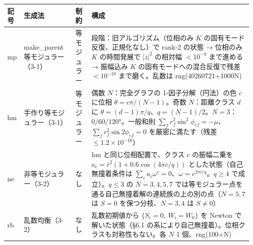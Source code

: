 \documentclass[
  10pt,
  a4paper,
]{ltjsarticle}
\newcounter{none} %
\begin{document}
{\def\LTcaptype{none} %
\begin{longtable}[]{@{}
  >{\raggedright\arraybackslash}p{}
  >{\raggedright\arraybackslash}p{}
  >{\raggedright\arraybackslash}p{}
  >{\raggedright\arraybackslash}p{}@{}}
\toprule\noalign{}
\begin{minipage}[b]{\linewidth}\raggedright
記号
\end{minipage} & \begin{minipage}[b]{\linewidth}\raggedright
生成法
\end{minipage} & \begin{minipage}[b]{\linewidth}\raggedright
制約
\end{minipage} & \begin{minipage}[b]{\linewidth}\raggedright
構成
\end{minipage} \\
\midrule\noalign{}
\endhead
\bottomrule\noalign{}
\endlastfoot
mp & make\_parent 等モジュラー（3-1） & 等モジュラー & 3
段階：旧アルゴリズム（位相のみ \(K\) の固有モード反復、正規化なし）で
rank-2 の状態 → 位相のみ \(K\) の時間発展で \(|z|^2\) の相対幅
\(<10^{-9}\) まで進める → 振幅込み \(K\) の固有モードへの混合反復で残差
\(<10^{-10}\) まで磨く。乱数は rng(40260721+1000N) \\
hm & 手作り等モジュラー（3-1） & 等モジュラー & 偶数 \(N\)：完全グラフの
1-因子分解（円法）の色 \(c\) に位相 \(\theta=c\pi/(N-1)\)。奇数
\(N\)：距離クラス \(d\) に
\(\theta=(d-1)\pi/q\)、\(q=(N-1)/2\)。\(N=3\)：\(0/60/120°\)。一般和則
\(\sum_f r_f^2\sin^2\phi_{ef}=-\mu\)、\(\sum_f r_f^2\sin2\phi_{ef}=0\)
を厳密に満たす（残差 \(\le1.2\times10^{-16}\)） \\
ne & 非等モジュラー（3-2） & なし & hm と同じ位相配置で、クラス \(c\)
の振幅二乗を \(a_c=\bar r^2(1+0.6\cos(4\pi c/q))\)
とした状態（自己無撞着条件は
\(\sum_ca_c\omega^c=0\)、\(\omega=e^{2\pi i/q}\)。\(q\ge4\)
で成立）。\(q\le3\) の \(N=3,4,5,7\)
では等モジュラー点を通る自己無撞着解の連続族の上の別の点（\(N=5,7\) は
\(S=0\) を保つ分枝、\(N=3,4\) は \(S\ne0\)） \\
rb & 乱数均衡（3-2） & なし & 乱数初期値から \(\{S_i=0,\ W_i=W_0\}\) を
Newton で解いた状態（§6.1
の系により自己無撞着）。位相クラスも対称性もない。各 \(N\) 1
個、rng(100+N) \\
\end{longtable}
}
\end{document}
